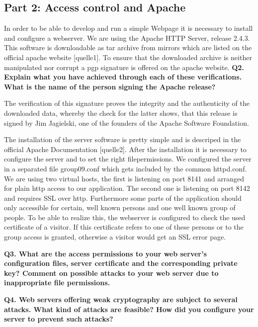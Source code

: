 \subsection {Part 2: Access control and Apache}

In order to be able to develop and run a simple Webpage it is necessary to install and configure a webserver. 
We are using  the Apache HTTP Server, release 2.4.3. This software is downloadable as tar archive from mirrors 
which are listed on the official apache website [quelle1]. To ensure that the downloaded archive is neither manipulated 
nor corrupt a pgp signature is offered on the apache website. 
\newline
\noindent
{\bf Q2. Explain what you have achieved through each of these verifications.
What is the name of the person signing the Apache release?}
\newline

The verification of this signature proves the integrity and the authenticity of the downloaded data, 
whereby the check for the latter shows, that this release is signed by Jim Jagielski, 
one of the founders of the Apache Software Foundation. 
\newline

The installation of the server software is pretty simple and is descriped in the official Apache Documentation [quelle2].
After the installation it is necessary to configure the server and to set the right filepermissions. 
We configured the server in a separated file group09.conf which gets included by the common httpd.conf. 
We are using two virtual hosts, the first is listening on port 8141 and arranged for plain http access to our application.
The second one is listening on port 8142 and requires SSL over http. 
Furthermore some parts of the application should only accessible for certain, 
well known persons and one well known group of people. To be able to realize this, 
the webserver is configured to check the used certificate of a visitor. 
If this certificate refers to one of these persons or to the group access is granted, 
otherwise a visitor would get an SSL error page.

\noindent
{\bf Q3. What are the access permissions to your web server’s configuration files,
server certificate and the corresponding private key? Comment on possible
attacks to your web server due to inappropriate file permissions.}
\newline


\noindent
{\bf Q4. Web servers offering weak cryptography are subject to several attacks.
What kind of attacks are feasible? How did you configure your server to prevent such attacks?}

